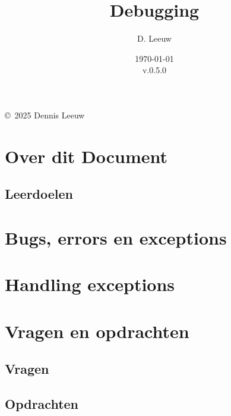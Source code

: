 \documentclass[a4paper,12pt,twoside,openright,titlepage]{book}
\author{D. Leeuw}
\title{Debugging}
\date{\today\\v.0.5.0}
\begin{document}

\maketitle

\copyright\ 2025 Dennis Leeuw\\




\frontmatter
\chapter{Over dit Document}
\section{Leerdoelen}


\tableofcontents

\mainmatter

\chapter{Bugs, errors en exceptions}


\chapter{Handling exceptions}


\chapter{Vragen en opdrachten}
\section{Vragen}

\section{Opdrachten}


\printindex
\end{document}
